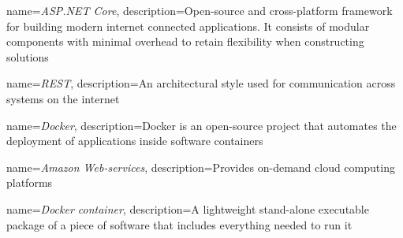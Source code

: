 {
	name=\textit{ASP.NET Core},
	description={Open-source and cross-platform framework for building modern internet connected applications. It consists of modular components with minimal overhead to retain flexibility when constructing solutions}
}

{
	name=\textit{REST},
	description={An architectural style used for communication across systems on the internet}
}

{
	name=\textit{Docker},
	description={Docker is an open-source project that automates the deployment of applications inside software containers}
}

{
	name=\textit{Amazon Web-services},
	description={Provides on-demand cloud computing platforms}
}

{
	name=\textit{Docker container},
	description={A lightweight stand-alone executable package of a piece of software that includes everything needed to run it}
}











